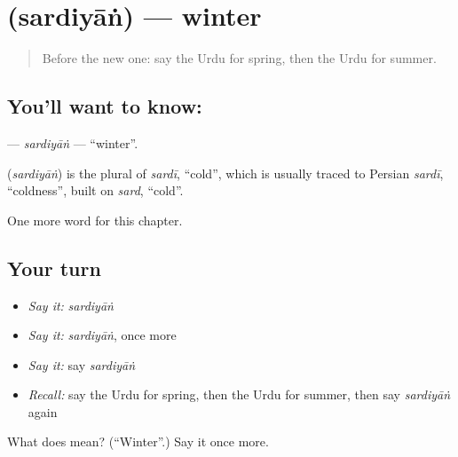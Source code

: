 \section[\texorpdfstring{\ur{سردیاں} (sardiyāṅ)}{سردیاں (sardiyāṅ)}]{ (sardiyāṅ) — winter}

\label{lesson:UR-C94-sardiyan}



\begin{quote}
Before the new one: say the Urdu for spring, then the Urdu for summer.
\end{quote}

\subsection*{You'll want to know: }
\textbf{} — \emph{sardiyāṅ} — \textquotedblleft{}winter\textquotedblright{}.

\begin{cousinweb}
\textbf{} (\emph{sardiyāṅ}) is the plural of \emph{sardī}, \textquotedblleft{}cold\textquotedblright{}, which is usually traced to Persian \emph{sardī}, \textquotedblleft{}coldness\textquotedblright{}, built on \emph{sard}, \textquotedblleft{}cold\textquotedblright{}.
\end{cousinweb}

\begin{grammarlens}[title={What you've built}]
One more word for this chapter.
\end{grammarlens}

\subsection*{Your turn}
\begin{itemize}
\raggedright
  \item \emph{Say it:} \emph{sardiyāṅ}
  \item \emph{Say it:} \emph{sardiyāṅ}, once more
  \item \emph{Say it:} say \emph{sardiyāṅ}
  \item \emph{Recall:} say the Urdu for spring, then the Urdu for summer, then say \emph{sardiyāṅ} again
\end{itemize}

\begin{tcolorbox}[breakable,colback=teal!4,colframe=teal!35!black,title={Before you move on}]
What does  mean? (\textquotedblleft{}Winter\textquotedblright{}.) Say it once more.
\end{tcolorbox}
